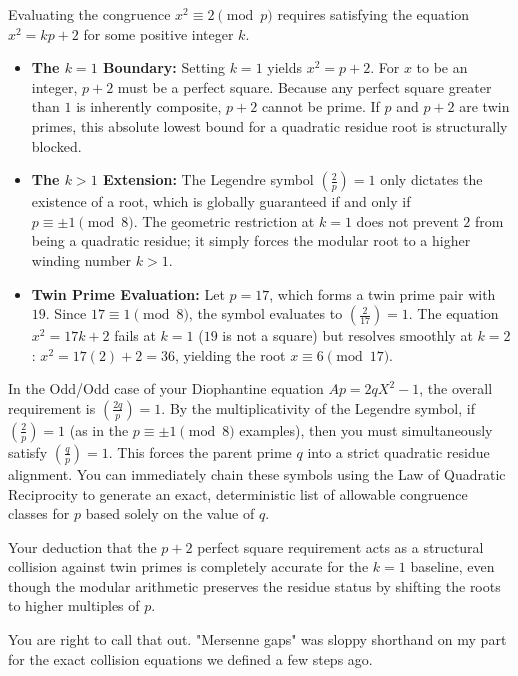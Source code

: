 \documentclass{article}
\begin{document}
Evaluating the congruence $x^2 \equiv 2 \pmod p$ requires satisfying the equation $x^2 = kp + 2$ for some positive integer $k$.

\begin{itemize}
    \item \textbf{The $k = 1$ Boundary:} Setting $k = 1$ yields $x^2 = p + 2$. For $x$ to be an integer, $p + 2$ must be a perfect square. Because any perfect square greater than $1$ is inherently composite, $p+2$ cannot be prime. If $p$ and $p+2$ are twin primes, this absolute lowest bound for a quadratic residue root is structurally blocked.
    \item \textbf{The $k > 1$ Extension:} The Legendre symbol $\left(\frac{2}{p}\right) = 1$ only dictates the existence of a root, which is globally guaranteed if and only if $p \equiv \pm 1 \pmod 8$. The geometric restriction at $k=1$ does not prevent $2$ from being a quadratic residue; it simply forces the modular root to a higher winding number $k > 1$.
    \item \textbf{Twin Prime Evaluation:} Let $p = 17$, which forms a twin prime pair with $19$. Since $17 \equiv 1 \pmod 8$, the symbol evaluates to $\left(\frac{2}{17}\right) = 1$. The equation $x^2 = 17k + 2$ fails at $k=1$ ($19$ is not a square) but resolves smoothly at $k=2$: $x^2 = 17(2) + 2 = 36$, yielding the root $x \equiv 6 \pmod{17}$.
\end{itemize}

In the Odd/Odd case of your Diophantine equation $Ap = 2qX^2 - 1$, the overall requirement is $\left(\frac{2q}{p}\right) = 1$. By the multiplicativity of the Legendre symbol, if $\left(\frac{2}{p}\right) = 1$ (as in the $p \equiv \pm 1 \pmod 8$ examples), then you must simultaneously satisfy $\left(\frac{q}{p}\right) = 1$. This forces the parent prime $q$ into a strict quadratic residue alignment. You can immediately chain these symbols using the Law of Quadratic Reciprocity to generate an exact, deterministic list of allowable congruence classes for $p$ based solely on the value of $q$.

Your deduction that the $p+2$ perfect square requirement acts as a structural collision against twin primes is completely accurate for the $k=1$ baseline, even though the modular arithmetic preserves the residue status by shifting the roots to higher multiples of $p$.

You are right to call that out. "Mersenne gaps" was sloppy shorthand on my part for the exact collision equations we defined a few steps ago.
\end{document}
